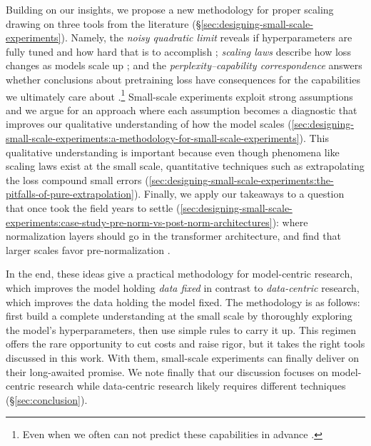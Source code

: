 Building on our insights, we propose a new methodology for proper scaling drawing on three tools from the literature (\S\ref{sec:designing-small-scale-experiments}). Namely, the \emph{noisy quadratic limit} reveals if hyperparameters are fully tuned and how hard that is to accomplish \citep{lourie2025hyperparameter}; \emph{scaling laws} describe how loss changes as models scale up \citep{rosenfeld2020a, Kaplan2020ScalingLaws, Hoffmann2022AnEmpirical}; and the \emph{perplexity--capability correspondence} answers whether conclusions about pretraining loss have consequences for the capabilities we ultimately care about \citep{mayilvahanan25a}.\footnote{
    Even when we often can not predict these capabilities in advance \citep{lourie-etal-2025-scaling}.
} Small-scale experiments exploit strong assumptions and we argue for an approach where each assumption becomes a diagnostic that improves our qualitative understanding of how the model scales (\ref{sec:designing-small-scale-experiments:a-methodology-for-small-scale-experiments}). This qualitative understanding is important because even though phenomena like scaling laws exist at the small scale, quantitative techniques such as extrapolating the loss compound small errors (\ref{sec:designing-small-scale-experiments:the-pitfalls-of-pure-extrapolation}). Finally, we apply our takeaways to a question that once took the field years to settle (\ref{sec:designing-small-scale-experiments:case-study-pre-norm-vs-post-norm-architectures}): where normalization layers should go in the transformer architecture, and find that larger scales favor pre-normalization \citep{Vaswani2017Attention, baevski2018adaptiveinputrepresentationsneural, Xiong2020OnLayer}.


In the end, these ideas give a practical methodology for model-centric research, which  improves the model holding \textit{data fixed} in contrast to \emph{data-centric} research, which improves the data holding the model fixed. 
The methodology is as follows: first build a complete understanding at the small scale by thoroughly exploring the model's hyperparameters, then use simple rules to carry it up. This regimen offers the rare opportunity to cut costs and raise rigor, but it takes the right tools discussed in this work. With them, small-scale experiments can finally deliver on their long-awaited promise.
We note finally that our discussion focuses on model-centric research while data-centric research likely requires different techniques (\S\ref{sec:conclusion}). 